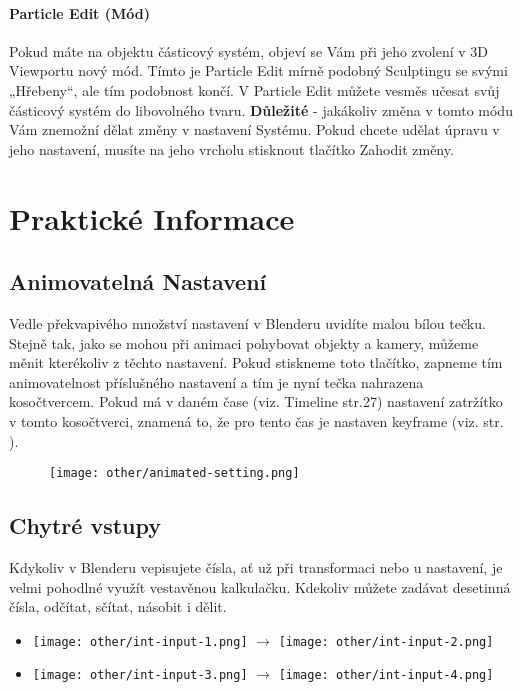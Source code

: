 \documentclass[12pt,a4paper]{report}
\begin{document}
	\paragraph{Particle Edit (Mód)} Pokud máte na objektu částicový systém, objeví
	se Vám při jeho zvolení v 3D Viewportu nový mód. Tímto je Particle Edit
	mírně podobný Sculptingu se svými „Hřebeny“, ale tím podobnost končí.
	V Particle Edit můžete vesměs učesat svůj částicový systém do
	libovolného tvaru. \textbf{Důležité} - jakákoliv změna v tomto módu Vám
	znemožní dělat změny v nastavení Systému. Pokud chcete udělat úpravu
	v jeho nastavení, musíte na jeho vrcholu stisknout tlačítko Zahodit
	změny.
	
	\section{Praktické Informace}
	\subsection{Animovatelná Nastavení}
	\label{section:animated-settings}
	Vedle překvapivého množství nastavení v Blenderu uvidíte malou bílou
	tečku. Stejně tak, jako se mohou při animaci pohybovat objekty
	a kamery, můžeme měnit kterékoliv z těchto nastavení. Pokud stiskneme
	toto tlačítko, zapneme tím animovatelnost příslušného nastavení a tím je
	nyní tečka nahrazena kosočtvercem. Pokud má v daném čase (viz.
	Timeline str.27) nastavení zatržítko v tomto kosočtverci, znamená to, že
	pro tento čas je nastaven keyframe (viz.  str. \pageref{section:keyframing}).
	\begin{figure}
		\centering
		\texttt{[image: other/animated-setting.png]}
		\caption{}
		\label{pic:animated-setting}
	\end{figure}

	\subsection{Chytré vstupy}
	Kdykoliv v Blenderu vepisujete čísla, ať už při transformaci nebo u
	nastavení, je velmi pohodlné využít vestavěnou kalkulačku. Kdekoliv
	můžete zadávat desetinná čísla, odčítat, sčítat, násobit i dělit.
	\begin{itemize}
		\item[] \texttt{[image: other/int-input-1.png]} $\rightarrow$ \texttt{[image: other/int-input-2.png]}
		\item[] \texttt{[image: other/int-input-3.png]} $\rightarrow$ \texttt{[image: other/int-input-4.png]}
	\end{itemize}
\end{document}

